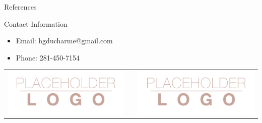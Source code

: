 \documentclass[final]{beamer}
\newlength{\onecolwid}
\begin{document}
\begin{frame}[t, fragile]
\begin{columns}[t]
\begin{column}{\onecolwid}

\begin{block}{References}

\nocite{*} %
\small{
}

\end{block}



\begin{block}{Contact Information}

\begin{itemize}
\item Email: hgducharme@gmail.com
\item Phone: 281-450-7154
\end{itemize}

\end{block}

\begin{center}
\begin{tabular}{ccc}
\includegraphics[width=0.4\linewidth]{logo.png} & \hfill & \includegraphics[width=0.4\linewidth]{logo.png}
\end{tabular}
\end{center}


\end{column} %

\end{columns} %

\end{frame}
\end{document}
